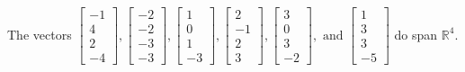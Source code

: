\begin{exercise}
\begin{exerciseStatement}
  \end{exerciseStatement}
  \begin{exerciseAnswer}
   The vectors \(\left[\begin{array}{r}
-1 \\
4 \\
2 \\
-4
\end{array}\right] , \left[\begin{array}{r}
-2 \\
-2 \\
-3 \\
-3
\end{array}\right] , \left[\begin{array}{r}
1 \\
0 \\
1 \\
-3
\end{array}\right] , \left[\begin{array}{r}
2 \\
-1 \\
2 \\
3
\end{array}\right] , \left[\begin{array}{r}
3 \\
0 \\
3 \\
-2
\end{array}\right] , \text{ and } \left[\begin{array}{r}
1 \\
3 \\
3 \\
-5
\end{array}\right]\) 
  	 do  
	span \(\mathbb{R}^4\).
  


  \end{exerciseAnswer}
\end{exercise}